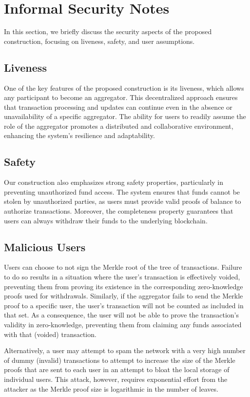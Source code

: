 \section{Informal Security Notes}

In this section, we briefly discuss the security aspects of the proposed construction, focusing on liveness, safety, and user assumptions.

\subsection{Liveness}
One of the key features of the proposed construction is its liveness, which allows any participant to become an aggregator. This decentralized approach ensures that transaction processing and updates can continue even in the absence or unavailability of a specific aggregator. The ability for users to readily assume the role of the aggregator promotes a distributed and collaborative environment, enhancing the system's resilience and adaptability.

\subsection{Safety}
Our construction also emphasizes strong safety properties, particularly in preventing unauthorized fund access. The system ensures that funds cannot be stolen by unauthorized parties, as users must provide valid proofs of balance to authorize transactions. Moreover, the completeness property guarantees that users can always withdraw their funds to the underlying blockchain.

\subsection{Malicious Users}
Users can choose to not sign the Merkle root of the tree of transactions. Failure to do so results in a situation where the user's transaction is effectively voided, preventing them from proving its existence in the corresponding zero-knowledge proofs used for withdrawals. Similarly, if the aggregator fails to send the Merkle proof to a specific user, the user's transaction will not be counted as included in that set. As a consequence, the user will not be able to prove the transaction's validity in zero-knowledge, preventing them from claiming any funds associated with that (voided) transaction.

Alternatively, a user may attempt to spam the network with a very high number of dummy (invalid) transactions to attempt to increase the size of the Merkle proofs that are sent to each user in an attempt to bloat the local storage of individual users. This attack, however, requires exponential effort from the attacker as the Merkle proof size is logarithmic in the number of leaves. 

